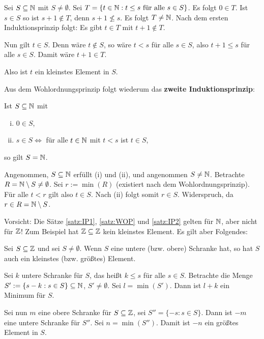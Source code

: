 	\begin{beweis}
		Sei $S \subseteq \mathbb{N}$ mit $S \neq \emptyset$.
		Sei $T = \{t \in \mathbb{N} : t \leq s \text{ für alle } s \in S\}$.
		Es folgt $0 \in T$.
		Ist $s \in S$ so ist $s+1 \notin T$, denn $s+1 \nleq s$.
		Es folgt $T \neq \mathbb{N}$.
		Nach dem ersten Induktionsprinzip folgt: Es gibt $t \in T$ mit $t+1 \notin T$.
		
		Nun gilt $t \in S$. Denn wäre $t \notin S$, so wäre $t < s$ für alle $s \in S$, also $t+1 \leq s$ für alle $s \in S$. Damit wäre $t+1 \in T$. \lightning
		
		Also ist $t$ ein kleinstes Element in $S$.
	\end{beweis}
	
	Aus dem Wohlordnungsprinzip folgt wiederum das \textbf{zweite Induktionsprinzip}:
	
	\begin{satz}
		\label{satz:IP2}
		Ist $S \subseteq \mathbb{N}$ mit
		\begin{enumerate}[(i)]
			\item $0 \in S$,
			\item $s \in S \Leftrightarrow$ für alle $t \in \mathbb{N}$ mit $t < s$ ist $t \in S$,
		\end{enumerate}
		so gilt $S = \mathbb{N}$.
	\end{satz}
	
	\begin{beweis}
		Angenommen, $S \subseteq \mathbb{N}$ erfüllt (i) und (ii), und angenommen $S \neq \mathbb{N}$.
		Betrachte $R = \mathbb{N} \setminus S \neq \emptyset$.
		Sei $r := \min(R)$ (existiert nach dem Wohlordnungsprinzip). Für alle $t < r$ gilt also $t \in S$. Nach (ii) folgt somit $r \in S$. Widerspruch, da $r \in R = \mathbb{N} \setminus S$.
	\end{beweis}

	Vorsicht: Die Sätze \ref{satz:IP1}, \ref{satz:WOP} und \ref{satz:IP2} gelten für $\mathbb{N}$, aber nicht für $\mathbb{Z}$!
	Zum Beispiel hat $\mathbb{Z} \subseteq \mathbb{Z}$ kein kleinstes Element.
	Es gilt aber Folgendes:
	
	\begin{lemma}
		\label{lemma:1.3}
		Sei $S \subseteq \mathbb{Z}$ und sei $S \neq \emptyset$.
		Wenn $S$ eine untere (bzw. obere) Schranke hat, so hat $S$ auch ein kleinstes (bzw. größtes) Element.
	\end{lemma}
	
	\begin{beweis}
		Sei $k$ untere Schranke für $S$, das heißt $k \leq s$ für alle $s \in S$.
		Betrachte die Menge $S' := \{s - k : s \in S\} \subseteq \mathbb{N}$, $S' \neq \emptyset$.
		Sei $l = \min(S')$.
		Dann ist $l+k$ ein Minimum für $S$.
		
		Sei nun $m$ eine obere Schranke für $S \subseteq \mathbb{Z}$, sei $S'' = \{-s : s \in S\}$.
		Dann ist $-m$ eine untere Schranke für $S''$.
		Sei $n = \min(S'')$.
		Damit ist $-n$ ein größtes Element in $S$. 
	\end{beweis}


